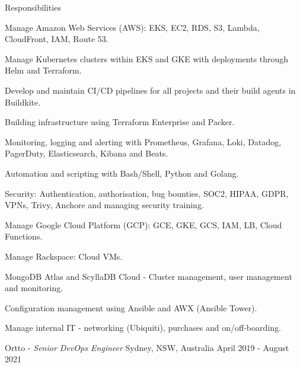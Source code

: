 \begin{cventries}
  \cventry
  {Responsibilities} %
  {} %
  {} %
  {} %
  {
    \begin{cvitems} %
      \item {Manage Amazon Web Services (AWS): EKS, EC2, RDS, S3, Lambda, CloudFront, IAM, Route 53.}
      \item {Manage Kubernetes clusters within EKS and GKE with deployments through Helm and Terraform.}
      \item {Develop and maintain CI/CD pipelines for all projects and their build agents in Buildkite.}
      \item {Building infrastructure using Terraform Enterprise and Packer.}
      \item {Monitoring, logging and alerting with Prometheus, Grafana, Loki, Datadog, PagerDuty, Elasticsearch, Kibana and Beats.}
      \item {Automation and scripting with Bash/Shell, Python and Golang.}
      \item {Security: Authentication, authorisation, bug bounties, SOC2, HIPAA, GDPR, VPNs, Trivy, Anchore and managing security training.}
      \item {Manage Google Cloud Platform (GCP): GCE, GKE, GCS, IAM, LB, Cloud Functions.}
      \item {Manage Rackspace: Cloud VMs.}
      \item {MongoDB Atlas and ScyllaDB Cloud - Cluster management, user management and monitoring.}
      \item {Configuration management using Ansible and AWX (Ansible Tower).}
      \item {Manage internal IT - networking (Ubiquiti), purchases and on/off-boarding.}
    \end{cvitems}
  }

  \cventry
  {} %
  {Ortto - \emph{Senior DevOps Engineer}} %
  {Sydney, NSW, Australia} %
  {April 2019 - August 2021} %
  {}


\end{cventries}
